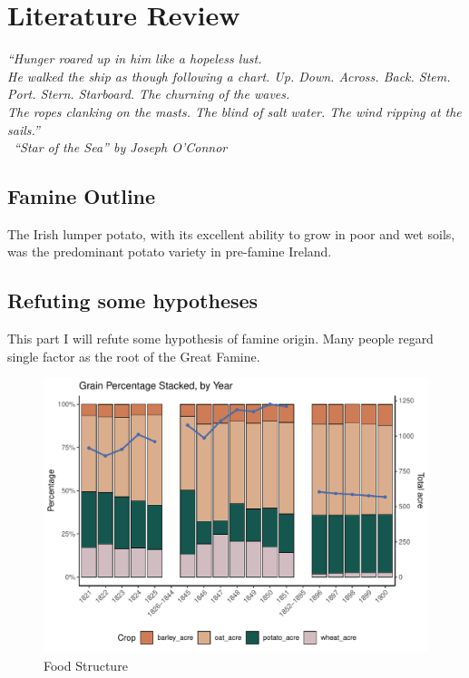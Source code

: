 \chapter{Literature Review}

\textit{``Hunger roared up in him like a hopeless lust.\\ 
He walked the ship as though following a chart. Up. Down. Across. Back. Stem. Port. Stern. Starboard. The churning of the waves. \\
The ropes clanking on the masts. The blind of salt water. The wind ripping at the sails.''\\
\textemdash\ ``Star of the Sea'' by Joseph O'Connor}
\vspace{.2cm}

\section{Famine Outline}

The Irish lumper potato, with its excellent ability to grow in poor and wet soils, was the predominant potato variety in pre-famine Ireland.

\section{Refuting some hypotheses}

This part I will refute some hypothesis of famine origin. Many people regard single factor as the root of the Great Famine.

\begin{figure}[h]
    \centering
    \caption{Food Structure}
    \includegraphics[width=.9\textwidth]{../03_outputs/food_structure.pdf}
\end{figure}

